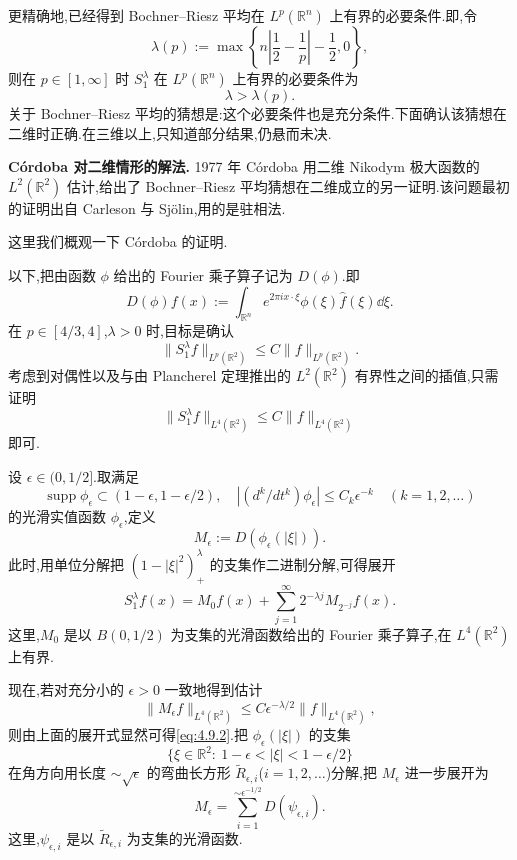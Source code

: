更精确地,已经得到 Bochner--Riesz 平均在 $L^{p}(\mathbb{R}^{n})$ 上有界的必要条件.即,令
\[
\lambda(p) := \max\left\{n\left|\frac{1}{2} - \frac{1}{p}\right| - \frac{1}{2}, 0\right\},
\]
则在 $p \in [1, \infty]$ 时 $S_{1}^{\lambda}$ 在 $L^{p}(\mathbb{R}^{n})$ 上有界的必要条件为
\[
\lambda > \lambda(p).
\]
关于 Bochner--Riesz 平均的猜想是:这个必要条件也是充分条件.下面确认该猜想在二维时正确.在三维以上,只知道部分结果,仍悬而未决.

\textbf{C\'ordoba 对二维情形的解法.} 1977 年 C\'ordoba 用二维 Nikodym 极大函数的 $L^{2}(\mathbb{R}^{2})$ 估计,给出了 Bochner--Riesz 平均猜想在二维成立的另一证明.该问题最初的证明出自 Carleson 与 Sj\"olin,用的是驻相法.

这里我们概观一下 C\'ordoba 的证明.

以下,把由函数 $\phi$ 给出的 Fourier 乘子算子记为 $D(\phi)$.即
\[
D(\phi)f(x) := \int_{\mathbb{R}^{n}}e^{2\pi i x\cdot\xi}\phi(\xi)\hat{f}(\xi)\dd\xi.
\]
在 $p \in [4/3, 4]$,$\lambda > 0$ 时,目标是确认
\[
\|S_{1}^{\lambda}f\|_{L^{p}(\mathbb{R}^{2})} \leq C\|f\|_{L^{p}(\mathbb{R}^{2})}.
\]
考虑到对偶性以及与由 Plancherel 定理推出的 $L^{2}(\mathbb{R}^{2})$ 有界性之间的插值,只需证明
\begin{equation}\tag{4.9.2}
\|S_{1}^{\lambda}f\|_{L^{4}(\mathbb{R}^{2})} \leq C\|f\|_{L^{4}(\mathbb{R}^{2})}
\label{eq:4.9.2}\end{equation}
即可.

设 $\epsilon \in (0, 1/2]$.取满足
\[
\operatorname{supp}\phi_{\epsilon} \subset (1-\epsilon, 1-\epsilon/2), \quad |(d^{k}/dt^{k})\phi_{\epsilon}| \leq C_{k}\epsilon^{-k} \quad (k = 1, 2, \dots)
\]
的光滑实值函数 $\phi_{\epsilon}$,定义
\[
M_{\epsilon} := D\left(\phi_{\epsilon}(|\xi|)\right).
\]
此时,用单位分解把 $(1-|\xi|^{2})_{+}^{\lambda}$ 的支集作二进制分解,可得展开
\[
S_{1}^{\lambda}f(x) = M_{0}f(x) + \sum_{j=1}^{\infty}2^{-\lambda j}M_{2^{-j}}f(x).
\]
这里,$M_{0}$ 是以 $B(0, 1/2)$ 为支集的光滑函数给出的 Fourier 乘子算子,在 $L^{4}(\mathbb{R}^{2})$ 上有界.

现在,若对充分小的 $\epsilon > 0$ 一致地得到估计
\begin{equation}\tag{4.9.3}
\|M_{\epsilon}f\|_{L^{4}(\mathbb{R}^{2})} \leq C\epsilon^{-\lambda/2}\|f\|_{L^{4}(\mathbb{R}^{2})},
\label{eq:4.9.3}\end{equation}
则由上面的展开式显然可得\eqref{eq:4.9.2}.把 $\phi_{\epsilon}(|\xi|)$ 的支集
\[
\{\xi \in \mathbb{R}^{2}:\ 1-\epsilon < |\xi| < 1-\epsilon/2\}
\]
在角方向用长度 $\sim\sqrt{\epsilon}$ 的弯曲长方形 $\tilde{R}_{\epsilon,i}$($i = 1, 2, \ldots$)分解,把 $M_{\epsilon}$ 进一步展开为
\[
M_{\epsilon} = \sum_{i=1}^{\sim\epsilon^{-1/2}}D(\psi_{\epsilon,i}).
\]
这里,$\psi_{\epsilon,i}$ 是以 $\tilde{R}_{\epsilon,i}$ 为支集的光滑函数.

